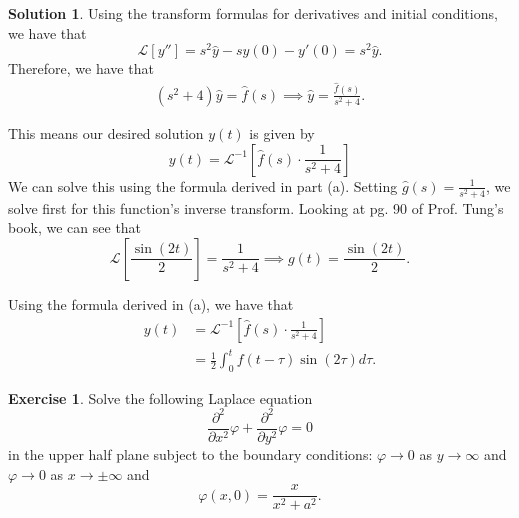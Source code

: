 \documentclass[12pt]{article}
\renewcommand{\phi}{\varphi}
\theoremstyle{definition}
\newtheorem{exer}{Exercise}
\newtheorem{sol}{Solution}
\theoremstyle{remark}
\begin{document}
\begin{sol}
    Using the transform formulas for derivatives and initial conditions, we have that
    \begin{equation*}
        \mathcal{L}[ y'' ] = s^{2} \hat{y} - s y(0) - y'(0) = s^{2} \hat{y}.
    \end{equation*}
    Therefore, we have that 
    \begin{align*}
    (s^{2} + 4) \hat{y} = \hat{f}(s) \implies \hat{y} = \frac{\hat{f}(s)}{s^{2} + 4}.
    \end{align*}

    This means our desired solution $y(t)$ is given by
    \begin{equation*}
        y(t) = \mathcal{L}^{-1}\left[ \hat{f}(s) \cdot \frac{1}{s^{2}+4} \right]
    \end{equation*}
    We can solve this using the formula derived in part (a). Setting $\hat{g}(s) = \frac{1}{s^{2}+4}$, we solve first for this function's inverse transform. Looking at pg. 90 of Prof. Tung's book, we can see that 
    \begin{equation*}
        \mathcal{L}\left[\frac{\sin(2t)}{2}\right] = \frac{1}{s^{2} + 4} \implies g(t) = \frac{\sin(2t)}{2}.
    \end{equation*}

    Using the formula derived in (a), we have that
      \begin{align*}
        y(t) &= \mathcal{L}^{-1}\left[ \hat{f}(s) \cdot \frac{1}{s^{2}+4} \right]\\
             &= \frac{1}{2}\int_{0}^{t} f(t-\tau) \sin(2\tau) d\tau.
    \end{align*}


\end{sol}

\newpage

\begin{exer}
    Solve the following Laplace equation
    \begin{equation*}
    \frac{\partial^{2}}{\partial x^{2}} \phi + \frac{\partial^{2}}{\partial y^{2}} \phi = 0 
    \end{equation*}
    in the upper half plane subject to the boundary conditions: $\phi\to 0$ as $y\to \infty$ and $\phi\to 0$ as $x\to \pm \infty$ and 
    \begin{equation*}
        \phi(x,0) = \frac{x}{x^{2} + a^{2}}.
    \end{equation*}
  \end{exer}
\end{document}
